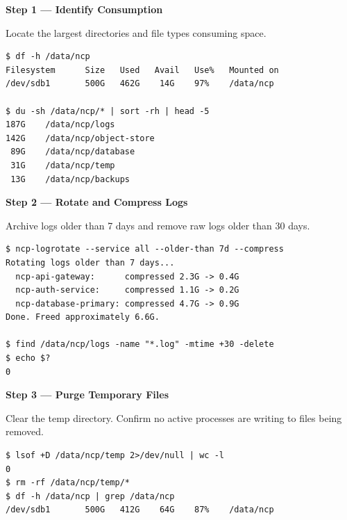 \begin{stepbox}
\textbf{Step 1 --- Identify Consumption}\smallskip

Locate the largest directories and file types consuming space.
\end{stepbox}

\begin{cmdbox}
\begin{Verbatim}[fontsize=\footnotesize]
$ df -h /data/ncp
Filesystem      Size   Used   Avail   Use%   Mounted on
/dev/sdb1       500G   462G    14G    97%    /data/ncp

$ du -sh /data/ncp/* | sort -rh | head -5
187G    /data/ncp/logs
142G    /data/ncp/object-store
 89G    /data/ncp/database
 31G    /data/ncp/temp
 13G    /data/ncp/backups
\end{Verbatim}
\end{cmdbox}

\begin{stepbox}
\textbf{Step 2 --- Rotate and Compress Logs}\smallskip

Archive logs older than 7 days and remove raw logs older than 30 days.
\end{stepbox}

\begin{cmdbox}
\begin{Verbatim}[fontsize=\footnotesize]
$ ncp-logrotate --service all --older-than 7d --compress
Rotating logs older than 7 days...
  ncp-api-gateway:      compressed 2.3G -> 0.4G
  ncp-auth-service:     compressed 1.1G -> 0.2G
  ncp-database-primary: compressed 4.7G -> 0.9G
Done. Freed approximately 6.6G.

$ find /data/ncp/logs -name "*.log" -mtime +30 -delete
$ echo $?
0
\end{Verbatim}
\end{cmdbox}

\begin{stepbox}
\textbf{Step 3 --- Purge Temporary Files}\smallskip

Clear the temp directory. Confirm no active processes are writing to files being removed.
\end{stepbox}

\begin{cmdbox}
\begin{Verbatim}[fontsize=\footnotesize]
$ lsof +D /data/ncp/temp 2>/dev/null | wc -l
0
$ rm -rf /data/ncp/temp/*
$ df -h /data/ncp | grep /data/ncp
/dev/sdb1       500G   412G    64G    87%    /data/ncp
\end{Verbatim}
\end{cmdbox}

